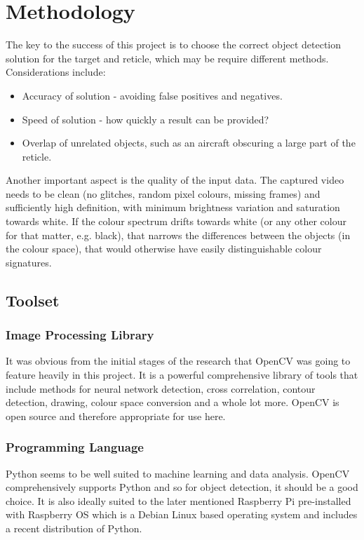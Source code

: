 \documentclass[final]{cmpreport_02}
\begin{document}
\section{Methodology}

The key to the success of this project is to choose the correct object detection solution for the target and reticle, which may be require different methods. Considerations include:

\begin{itemize}
	\item Accuracy of solution - avoiding false positives and negatives.
	\item Speed of solution - how quickly a result can be provided?
	\item Overlap of unrelated objects, such as an aircraft obscuring a large part of the reticle.
\end{itemize}
\noindent
Another important aspect is the quality of the input data. The captured video needs to be clean (no glitches, random pixel colours, missing frames) and sufficiently high definition, with minimum brightness variation and saturation towards white. If the colour spectrum drifts towards white (or any other colour for that matter, e.g. black), that narrows the differences between the objects (in the colour space), that would otherwise have easily distinguishable colour signatures.

\subsection{Toolset}

\subsubsection{Image Processing Library}

It was obvious from the initial stages of the research that OpenCV was going to feature heavily in this project. It is a powerful comprehensive library of tools that include methods for neural network detection, cross correlation, contour detection, drawing, colour space conversion and a whole lot more. OpenCV is open source and therefore appropriate for use here.

\subsubsection{Programming Language}

Python seems to be well suited to machine learning and data analysis. OpenCV comprehensively supports Python and so for object detection, it should be a good choice. It is also ideally suited to the later mentioned Raspberry Pi pre-installed with Raspberry OS which is a Debian Linux based operating system and includes a recent distribution of Python.
\end{document}
